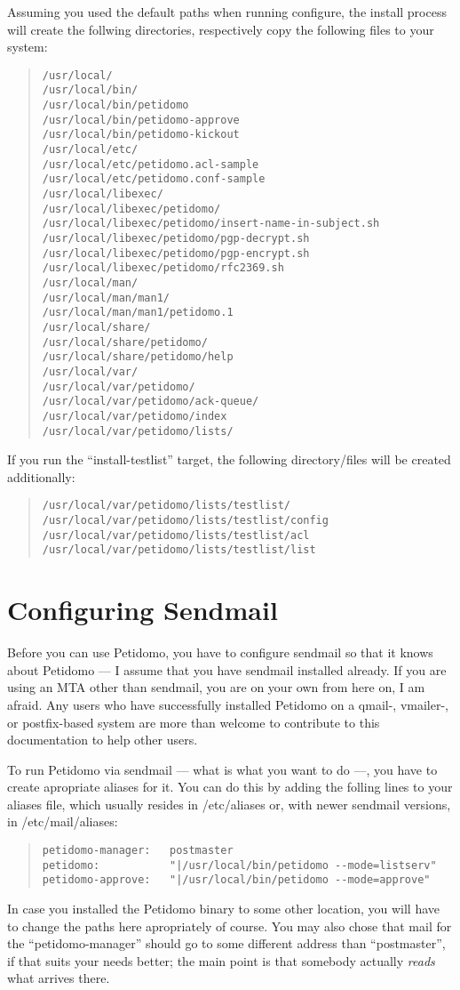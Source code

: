 \documentclass[a4paper,10pt]{scrreprt}
\begin{document}
Assuming you used the default paths when running configure, the
install process will create the follwing directories, respectively
copy the following files to your system:
\begin{quote}
\begin{verbatim}
/usr/local/
/usr/local/bin/
/usr/local/bin/petidomo
/usr/local/bin/petidomo-approve
/usr/local/bin/petidomo-kickout
/usr/local/etc/
/usr/local/etc/petidomo.acl-sample
/usr/local/etc/petidomo.conf-sample
/usr/local/libexec/
/usr/local/libexec/petidomo/
/usr/local/libexec/petidomo/insert-name-in-subject.sh
/usr/local/libexec/petidomo/pgp-decrypt.sh
/usr/local/libexec/petidomo/pgp-encrypt.sh
/usr/local/libexec/petidomo/rfc2369.sh
/usr/local/man/
/usr/local/man/man1/
/usr/local/man/man1/petidomo.1
/usr/local/share/
/usr/local/share/petidomo/
/usr/local/share/petidomo/help
/usr/local/var/
/usr/local/var/petidomo/
/usr/local/var/petidomo/ack-queue/
/usr/local/var/petidomo/index
/usr/local/var/petidomo/lists/
\end{verbatim}
\end{quote}
If you run the ``install-testlist'' target, the following
directory/files will be created additionally:
\begin{quote}
\begin{verbatim}
/usr/local/var/petidomo/lists/testlist/
/usr/local/var/petidomo/lists/testlist/config
/usr/local/var/petidomo/lists/testlist/acl
/usr/local/var/petidomo/lists/testlist/list
\end{verbatim}
\end{quote}

\section{Configuring Sendmail}

Before you can use Petidomo, you have to configure sendmail so that it
knows about Petidomo --- I assume that you have sendmail installed
already. If you are using an MTA other than sendmail, you are on your
own from here on, I am afraid. Any users who have successfully
installed Petidomo on a qmail-, vmailer-, or postfix-based system are
more than welcome to contribute to this documentation to help other
users.

To run Petidomo via sendmail --- what is what you want to do ---, you
have to create apropriate aliases for it. You can do this by adding
the folling lines to your {\sf aliases} file, which usually resides in
{\sf /etc/aliases} or, with newer sendmail versions, in {\sf
/etc/mail/aliases}:
\begin{quote}
\begin{verbatim}
petidomo-manager:   postmaster
petidomo:           "|/usr/local/bin/petidomo --mode=listserv"
petidomo-approve:   "|/usr/local/bin/petidomo --mode=approve"
\end{verbatim}
\end{quote}
In case you installed the Petidomo binary to some other location, you
will have to change the paths here apropriately of course. You may
also chose that mail for the ``petidomo-manager'' should go to some
different address than ``postmaster'', if that suits your needs
better; the main point is that somebody actually \emph{reads} what
arrives there.
\end{document}
